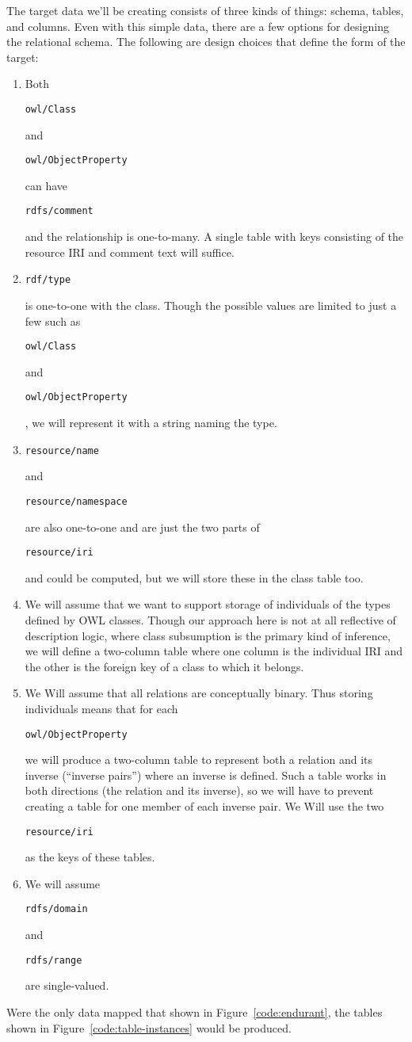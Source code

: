\documentclass[9pt,letterpaper]{article}
\newcommand{\stt}[1]{\begin{footnotesize}\texttt{#1}\end{footnotesize}}
\begin{document}
The target data we'll be creating consists of three kinds of things: schema, tables, and columns.
Even with this simple data, there are a few options for designing the relational schema.
The following are design choices that define the form of the target:
\begin{enumerate}
\item Both \stt{owl/Class} and \stt{owl/ObjectProperty} can have \stt{rdfs/comment} and the relationship is one-to-many.
  A single table with keys consisting of the resource IRI and comment text will suffice.
\item \stt{rdf/type} is one-to-one with the class. Though the possible values are limited to just a few such as \stt{owl/Class} and
  \stt{owl/ObjectProperty}, we will represent it with a string naming the type.
\item \stt{resource/name} and \stt{resource/namespace} are also one-to-one and are just the two parts of \stt{resource/iri} and could be computed, but we will store these in the class table too.
\item We will assume that we want to support storage of individuals of the types defined by OWL classes.
  Though our approach here is not at all reflective of description logic, where class subsumption is the primary kind of inference, 
  we will define a two-column table where one column is the individual IRI and the other is the foreign key of a class to which it belongs.
\item We Will assume that all relations are conceptually binary.
  Thus storing individuals means that for each \stt{owl/ObjectProperty} we will produce a two-column table to represent both a relation and its inverse (``inverse pairs'') where an inverse is defined.
Such a table works in both directions (the relation and its inverse), so we will have to prevent creating a table for one member of each inverse pair.
We Will use the two \stt{resource/iri} as the keys of these tables.
\item We will assume \stt{rdfs/domain} and \stt{rdfs/range} are single-valued.
\end{enumerate}

%
Were the only data mapped that shown in Figure~\ref{code:endurant}, the tables shown in Figure~\ref{code:table-instances} would be produced.  
\end{document}
